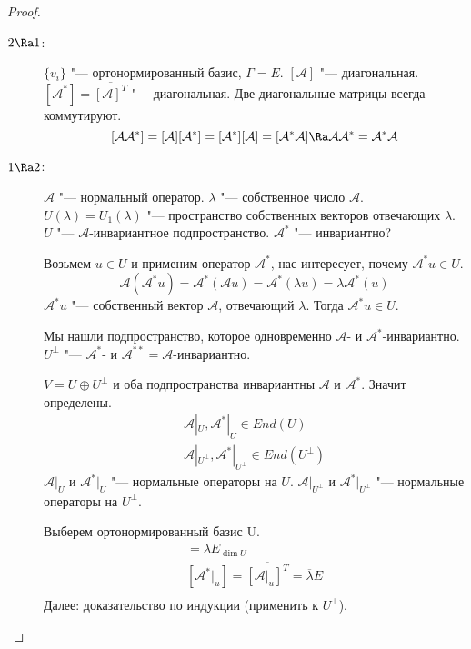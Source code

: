 \begin{proof}
	\begin{description}
	\item[$2 \Ra 1$:]
		$\{v_i\}$ "--- ортонормированный базис, $\Gamma = E$.
		$[\mathcal A] $ "--- диагональная.
		$[\mathcal{A}^*] = \overline{[\mathcal A]^T}$ "--- диагональная.
		Две диагональные матрицы всегда коммутируют.
		\[
			[\mathcal A\mathcal{A}^*]
			= [\mathcal A][\mathcal{A}^*]
			= [\mathcal{A}^*][\mathcal A]
			= [\mathcal{A}^*\mathcal A]
			\Ra \mathcal A\mathcal{A}^*
			= \mathcal{A}^*\mathcal A
		\]

	\item[$1 \Ra 2$:]
		$\mathcal A$ "--- нормальный оператор.
		$\lambda$ "--- собственное число $\mathcal A$.
		$U(\lambda) = U_1(\lambda)$ "--- пространство собственных векторов отвечающих $\lambda$.
		$U$ "--- $\mathcal A$-инвариантное подпространство.
		$\mathcal{A}^*$ "--- инвариантно?

		Возьмем $u \in U$ и применим оператор $\mathcal{A}^*$, нас интересует, почему $\mathcal{A}^*u \in U$.
		\[ \mathcal A(\mathcal{A}^*u) = \mathcal{A}^*(\mathcal Au) = \mathcal{A}^*(\lambda u) = \lambda \mathcal{A}^*(u) \]
		$\mathcal{A}^*u$ "--- собственный вектор $\mathcal A$, отвечающий $\lambda$.
		Тогда $\mathcal{A}^*u \in U$.

		Мы нашли подпространство, которое одновременно $\mathcal A$- и $\mathcal{A}^*$-инвариантно.
		$U^{\bot}$ "--- $\mathcal{A}^*$- и $\mathcal{A}^{**} = \mathcal A$-инвариантно.

		$V = U \oplus U^{\bot}$ и оба подпространства инвариантны $\mathcal A$ и $\mathcal{A}^*$.
		Значит определены.
		\begin{gather*}
			\mathcal A|_U, \mathcal{A}^*|_U \in End(U) \\
			\mathcal A|_{U^{\bot}}, \mathcal{A}^*|_{U^{\bot}} \in End(U^{\bot})
		\end{gather*}
		$\mathcal A|_U$ и $\mathcal{A}^*|_U$ "--- нормальные операторы на $U$.
		$\mathcal A|_{U^{\bot}}$ и $\mathcal{A}^*|_{U^{\bot}}$ "--- нормальные операторы на $U^{\bot}$.

		Выберем ортонормированный базис U.
		\begin{gather*}
			[\mathcal A|_u] = \lambda E_{\dim U} \\
			[\mathcal{A}^*|_u] = \overline{[\mathcal A|_u]^T} = \overline{\lambda}E \\
		\end{gather*}
		Далее: доказательство по индукции (применить к $U^{\bot}$).
	\end{description}
\end{proof}

